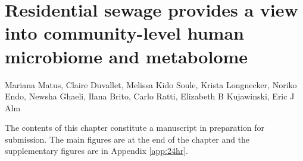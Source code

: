 
\graphicspath{{24hr/figures/}}

\chapter{Residential sewage provides a view into community-level human microbiome and metabolome}\label{chap:24hr}

\noindent
Mariana Matus, Claire Duvallet, Melissa Kido Soule, Krista Longnecker, Noriko Endo, Newsha Ghaeli, Ilana Brito, Carlo Ratti, Elizabeth B Kujawinski, Eric J Alm

\bigskip
\bigskip
\noindent
The contents of this chapter constitute a manuscript in preparation for submission. The main figures are at the end of the chapter and the supplementary figures are in Appendix \ref{app:24hr}.

\clearpage

